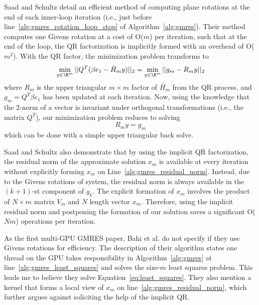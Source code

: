 Saad and Schultz \cite{Saad1986} detail an efficient method of computing plane rotations at the end of each inner-loop iteration (i.e., just before line~\ref{alg:gmres_rotation_loop_stop} of Algorithm~\ref{alg:gmres}). Their method computes one Givens rotation at a cost of O($m$) per iteration, such that at the end of the loop, the QR factorization is implicitly formed with an overhead of O($m^2$). With the QR factor, the minimization problem transforms to 
$$\min_{y \in \R^m} ||Q^T (\beta e_1 - \bar{H}_m y) ||_2 = \min_{y \in \R^m} ||g_m - R_m y||_2$$
where $R_m$ is the upper triangular $m\times m$ factor of $\bar{H}_m$ from the QR process, and $g_m = Q^T \beta e_1$ has been updated at each iteration. Now, using the knowledge that the 2-norm of a vector is invariant under orthogonal transformations (i.e., the matrix $Q^T$), our minimization problem reduces to solving $$ R_m y = g_m $$ which can be done with a simple upper triangular back solve. 

Saad and Schultz \cite{Saad1986} also demonstrate that by using the implicit QR factorization, the residual norm of the approximate solution $x_m$ is available at every iteration without explicitly forming $x_m$ on Line~\ref{alg:gmres_residual_norm}. Instead, due to the Givens rotations of system, the residual norm is always available in the $(k+1)$-st component of $g_k$. The explicit formation of $x_m$ involves the product of $N \times m$ matrix $V_m$ and $N$ length vector $x_m$. Therefore, using the implicit residual norm and postponing the formation of our solution saves a significant O($Nm$) operations per iteration. 

As the first multi-GPU GMRES paper, Bahi et al. \cite{Bahi2011} do not specify if they use Givens rotations for efficiency. The description of their algorithm states one thread on the GPU takes responsibility in Algorithm~\ref{alg:gmres} at line~\ref{alg:gmres_least_squares} and solves the size-$m$ least squares problem. This leads me to believe they solve Equation~\ref{eq:least_squares}. They also mention a kernel that forms a local view of $x_m$ on line~\ref{alg:gmres_residual_norm}, which further argues against soliciting the help of the implicit QR.  


